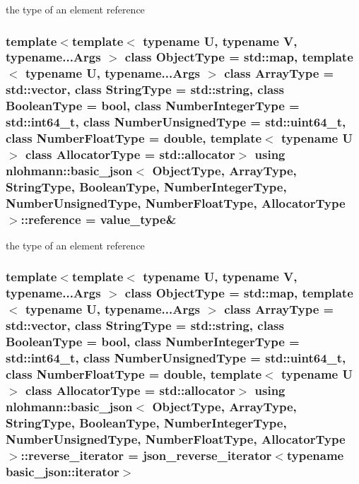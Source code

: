 the type of an element reference 

\hypertarget{classnlohmann_1_1basic__json_a3ec8e17be8732fe436e9d6733f52b7a3}{
\subsubsection[{reference}]{\setlength{\rightskip}{0pt plus 5cm}template$<$template$<$ typename U, typename V, typename...\-Args $>$ class Object\-Type = std\-::map, template$<$ typename U, typename...\-Args $>$ class Array\-Type = std\-::vector, class String\-Type  = std\-::string, class Boolean\-Type  = bool, class Number\-Integer\-Type  = std\-::int64\-\_\-t, class Number\-Unsigned\-Type  = std\-::uint64\-\_\-t, class Number\-Float\-Type  = double, template$<$ typename U $>$ class Allocator\-Type = std\-::allocator$>$ using {\bf nlohmann\-::basic\-\_\-json}$<$ Object\-Type, Array\-Type, String\-Type, Boolean\-Type, Number\-Integer\-Type, Number\-Unsigned\-Type, Number\-Float\-Type, Allocator\-Type $>$\-::{\bf reference} =  {\bf value\-\_\-type}\&}}\label{classnlohmann_1_1basic__json_a3ec8e17be8732fe436e9d6733f52b7a3}


the type of an element reference 

\hypertarget{classnlohmann_1_1basic__json_a2f1f83aa187a56dc5ec7a7027065ac8a}{
\subsubsection[{reverse\-\_\-iterator}]{\setlength{\rightskip}{0pt plus 5cm}template$<$template$<$ typename U, typename V, typename...\-Args $>$ class Object\-Type = std\-::map, template$<$ typename U, typename...\-Args $>$ class Array\-Type = std\-::vector, class String\-Type  = std\-::string, class Boolean\-Type  = bool, class Number\-Integer\-Type  = std\-::int64\-\_\-t, class Number\-Unsigned\-Type  = std\-::uint64\-\_\-t, class Number\-Float\-Type  = double, template$<$ typename U $>$ class Allocator\-Type = std\-::allocator$>$ using {\bf nlohmann\-::basic\-\_\-json}$<$ Object\-Type, Array\-Type, String\-Type, Boolean\-Type, Number\-Integer\-Type, Number\-Unsigned\-Type, Number\-Float\-Type, Allocator\-Type $>$\-::{\bf reverse\-\_\-iterator} =  {\bf json\-\_\-reverse\-\_\-iterator}$<$typename {\bf basic\-\_\-json\-::iterator}$>$}}\label{classnlohmann_1_1basic__json_a2f1f83aa187a56dc5ec7a7027065ac8a}


